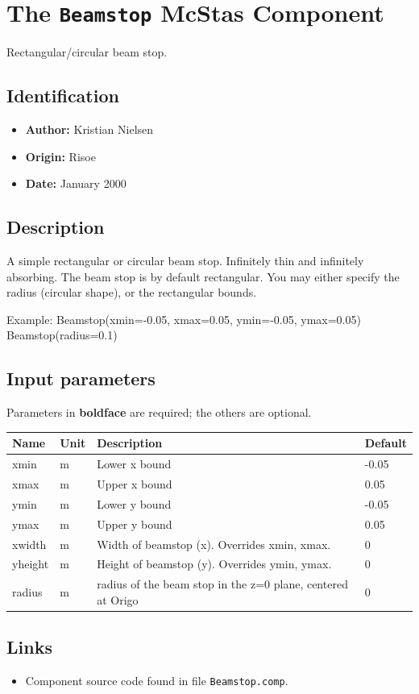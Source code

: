 \section{The \texttt{Beamstop} McStas Component}
Rectangular/circular beam stop.

\subsection*{Identification}
\begin{itemize}
  \item \textbf{Author:} Kristian Nielsen
  \item \textbf{Origin:} Risoe
  \item \textbf{Date:} January 2000
\end{itemize}

\subsection*{Description}
A simple rectangular or circular beam stop. Infinitely thin and infinitely absorbing. The beam stop is by default rectangular. You may either specify the radius (circular shape), or the rectangular bounds.

Example: Beamstop(xmin=-0.05, xmax=0.05, ymin=-0.05, ymax=0.05) Beamstop(radius=0.1)

\subsection*{Input parameters}
Parameters in \textbf{boldface} are required; the others are optional.

\begin{longtable}{p{}p{}p{}p{}}
\toprule
\textbf{Name} & \textbf{Unit} & \textbf{Description} & \textbf{Default} \\
\midrule
\endhead
xmin & m & Lower x bound & -0.05 \\
xmax & m & Upper x bound & 0.05 \\
ymin & m & Lower y bound & -0.05 \\
ymax & m & Upper y bound & 0.05 \\
xwidth & m & Width of beamstop (x). Overrides xmin, xmax. & 0 \\
yheight & m & Height of beamstop (y). Overrides ymin, ymax. & 0 \\
radius & m & radius of the beam stop in the z=0 plane, centered at Origo & 0 \\
\bottomrule
\end{longtable}

\subsection*{Links}
\begin{itemize}
  \item Component source code found in file \texttt{Beamstop.comp}.
\end{itemize}
